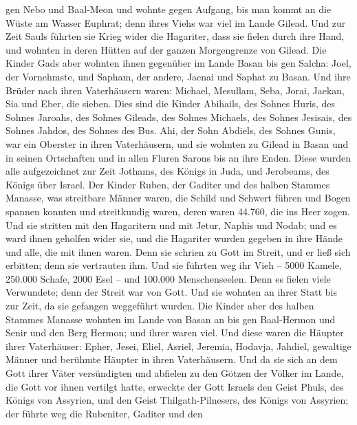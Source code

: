 gen Nebo und Baal-Meon  und wohnte gegen Aufgang, bis man
kommt an die Wüste am Wasser Euphrat; denn ihres Viehs war viel im Lande
Gilead.  Und zur Zeit Sauls führten sie Krieg wider die
Hagariter, dass sie fielen durch ihre Hand, und wohnten in deren Hütten
auf der ganzen Morgengrenze von Gilead.  Die Kinder Gads
aber wohnten ihnen gegenüber im Lande Basan bis gen Salcha:
 Joel, der Vornehmste, und Sapham, der andere, Jaenai und
Saphat zu Basan.  Und ihre Brüder nach ihren Vaterhäusern
waren: Michael, Mesullam, Seba, Jorai, Jaekan, Sia und Eber, die sieben.
 Dies sind die Kinder Abihails, des Sohnes Huris, des
Sohnes Jaroahs, des Sohnes Gileads, des Sohnes Michaels, des Sohnes
Jesisais, des Sohnes Jahdos, des Sohnes des Bus.  Ahi, der
Sohn Abdiels, des Sohnes Gunis, war ein Oberster in ihren Vaterhäusern,
 und sie wohnten zu Gilead in Basan und in seinen
Ortschaften und in allen Fluren Sarons bis an ihre Enden. 
Diese wurden alle aufgezeichnet zur Zeit Jothams, des Königs in Juda,
und Jerobeams, des Königs über Israel.  Der Kinder Ruben,
der Gaditer und des halben Stammes Manasse, was streitbare Männer waren,
die Schild und Schwert führen und Bogen spannen konnten und streitkundig
waren, deren waren 44.760, die ins Heer zogen.  Und sie
stritten mit den Hagaritern und mit Jetur, Naphis und Nodab;
 und es ward ihnen geholfen wider sie, und die Hagariter
wurden gegeben in ihre Hände und alle, die mit ihnen waren. Denn sie
schrien zu Gott im Streit, und er ließ sich erbitten; denn sie
vertrauten ihm.  Und sie führten weg ihr Vieh -- 5000
Kamele, 250.000 Schafe, 2000 Esel -- und 100.000 Menschenseelen.
 Denn es fielen viele Verwundete; denn der Streit war von
Gott. Und sie wohnten an ihrer Statt bis zur Zeit, da sie gefangen
weggeführt wurden.  Die Kinder aber des halben Stammes
Manasse wohnten im Lande von Basan an bis gen Baal-Hermon und Senir und
den Berg Hermon; und ihrer waren viel.  Und diese waren die
Häupter ihrer Vaterhäuser: Epher, Jesei, Eliel, Asriel, Jeremia,
Hodavja, Jahdiel, gewaltige Männer und berühmte Häupter in ihren
Vaterhäusern.  Und da sie sich an dem Gott ihrer Väter
versündigten und abfielen zu den Götzen der Völker im Lande, die Gott
vor ihnen vertilgt hatte,  erweckte der Gott Israels den
Geist Phuls, des Königs von Assyrien, und den Geist Thilgath-Pilnesers,
des Königs von Assyrien; der führte weg die Rubeniter, Gaditer und den
